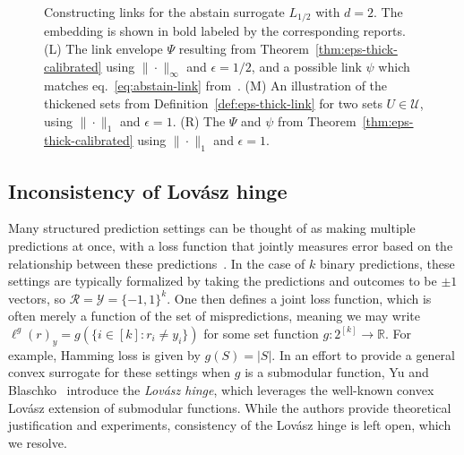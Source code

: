 \documentclass[11pt]{article}
\newcommand{\reals}{\mathbb{R}}
\newcommand{\R}{\mathcal{R}}
\newcommand{\U}{\mathcal{U}}
\newcommand{\Y}{\mathcal{Y}}
\begin{document}
\begin{figure}
\begin{center}
\begin{minipage}{0.32\linewidth}
\end{minipage}\hfill
\caption{Constructing links for the abstain surrogate $L_{1/2}$ with $d=2$. The embedding is shown in bold labeled by the corresponding reports. (L) The link envelope $\Psi$ resulting from Theorem~\ref{thm:eps-thick-calibrated} using $\|\cdot\|_\infty$ and $\epsilon = 1/2$, and a possible link $\psi$ which matches eq.~\eqref{eq:abstain-link} from~\cite{ramaswamy2018consistent}.  (M) An illustration of the thickened sets from Definition~\ref{def:eps-thick-link} for two sets $U \in \U$, using $\|\cdot\|_1$ and $\epsilon = 1$. (R) The $\Psi$ and $\psi$ from Theorem~\ref{thm:eps-thick-calibrated} using $\|\cdot\|_1$ and $\epsilon = 1$.}
\label{fig:abstain-links}
\end{center}
\end{figure}


\subsection{Inconsistency of Lov\'asz hinge}
\label{sec:lovasz-hinge}

Many structured prediction settings can be thought of as making multiple predictions at once, with a loss function that jointly measures error based on the relationship between these predictions~\cite{hazan2010direct, gao2011consistency, osokin2017structured}.
In the case of $k$ binary predictions, these settings are typically formalized by taking the predictions and outcomes to be $\pm 1$ vectors, so $\R=\Y=\{-1,1\}^k$.
One then defines a joint loss function, which is often merely a function of the set of mispredictions, meaning we may write $\ell^g(r)_y = g(\{i \in [k] : r_i \neq y_i\})$ for some set function $g:2^{[k]}\to\reals$.
For example, Hamming loss is given by $g(S) = |S|$.
In an effort to provide a general convex surrogate for these settings when $g$ is a submodular function, Yu and Blaschko~\cite{yu2018lovasz} introduce the \emph{Lov\'asz hinge}, which leverages the well-known convex Lov\'asz extension of submodular functions.
While the authors provide theoretical justification and experiments, consistency of the Lov\'asz hinge is left open, which we resolve.
\end{document}

